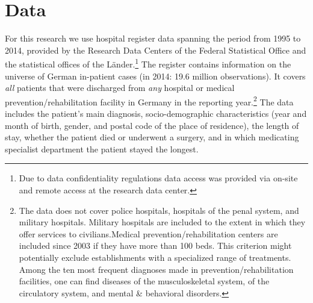 \documentclass[11pt, a4paper]{article} %
\begin{document}









\bigskip
\section{Data}\label{sec:data} 
For this research we use hospital register data spanning the period from 1995 to 2014, provided by the Research Data Centers of the Federal Statistical Office and the statistical offices of the Länder.\footnote{Due to data confidentiality regulations data access was provided via on-site and remote access at the research data center.} The register contains information on the universe of German in-patient cases (in 2014: 19.6 million observations). It covers \textit{all} patients that were discharged from \textit{any} hospital or medical prevention/rehabilitation facility in Germany in the reporting year.\footnote{The data does not cover police hospitals, hospitals of the penal system, and military hospitals. Military hospitals are included to the extent in which they offer services to civilians.\newline Medical prevention/rehabilitation centers are included since 2003 if they have more than 100 beds. This criterion might potentially exclude establishments with a specialized range of treatments. Among the ten most frequent diagnoses made in prevention/rehabilitation facilities, one can find diseases of the musculoskeletal system, of the circulatory system, and mental \& behavioral disorders.} The data includes the patient's main diagnosis, socio-demographic characteristics (year and month of birth, gender, and postal code of the place of residence), the length of stay, whether the patient died or underwent a surgery, and in which medicating specialist department the patient stayed the longest.\newline 
\end{document}
